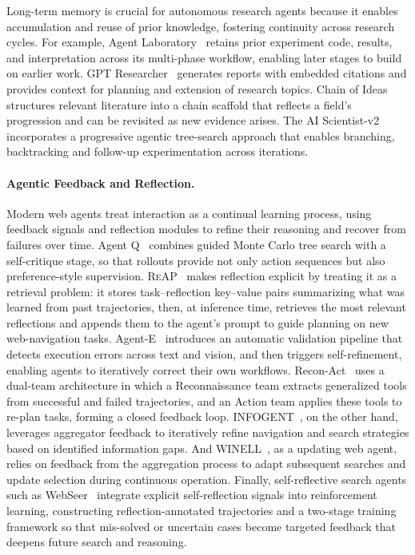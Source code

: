 Long-term memory is crucial for autonomous research agents because it enables accumulation and reuse of prior knowledge, fostering continuity across research cycles. For example, Agent Laboratory~\cite{schmidgall2025agentlaboratoryusingllm} retains prior experiment code, results, and interpretation across its multi-phase workflow, enabling later stages to build on earlier work. GPT Researcher~\cite{Elovic2023gptresearcher} generates reports with embedded citations and provides context for planning and extension of research topics. Chain of Ideas~\cite{li2024chainideasrevolutionizingresearch} structures relevant literature into a chain scaffold that reflects a field’s progression and can be revisited as new evidence arises. The AI Scientist-v2~\cite{yamada2025ai} incorporates a progressive agentic tree-search approach that enables branching, backtracking and follow-up experimentation across iterations.




\paragraph{Agentic Feedback and Reflection.}


Modern web agents treat interaction as a continual learning process, using feedback signals and reflection modules to refine their reasoning and recover from failures over time. Agent Q~\cite{putta2024agent} combines guided Monte Carlo tree search with a self-critique stage, so that rollouts provide not only action sequences but also preference-style supervision. \textsc{ReAP}~\cite{azam2025reflection} makes reflection explicit by treating it as a retrieval problem: it stores task–reflection key–value pairs summarizing what was learned from past trajectories, then, at inference time, retrieves the most relevant reflections and appends them to the agent’s prompt to guide planning on new web-navigation tasks. Agent-E~\cite{azam2024multimodal} introduces an automatic validation pipeline that detects execution errors across text and vision, and then triggers self-refinement, enabling agents to iteratively correct their own workflows. Recon-Act~\cite{he2025recon} uses a dual-team architecture in which a Reconnaissance team extracts generalized tools from successful and failed trajectories, and an Action team applies these tools to re-plan tasks, forming a closed feedback loop. INFOGENT~\cite{reddy2025infogent}, on the other hand, leverages aggregator feedback to iteratively refine navigation and search strategies based on identified information gaps. And WINELL~\cite{reddy2025winell}, as a updating web agent, relies on feedback from the aggregation process to adapt subsequent searches and update selection during continuous operation. Finally, self-reflective search agents such as WebSeer~\cite{he2025webseer} integrate explicit self-reflection signals into reinforcement learning, constructing reflection-annotated trajectories and a two-stage training framework so that mis-solved or uncertain cases become targeted feedback that deepens future search and reasoning.

